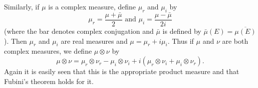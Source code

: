 Similarly, if $\mu$ is a complex measure, define $\mu_r$ and $\mu_i$ by $$\mu_r=\frac{\mu+\bar{\mu}}2\text{ and }\mu_i=\frac{\mu-\bar{\mu}}{2i}$$ (where the bar denotes complex conjugation and $\bar{\mu}$ is defined by $\bar{\mu}(E)=\overline{\mu(E)}$). Then $\mu_r$ and $\mu_i$ are real measures and $\mu=\mu_r+i\mu_i$. Thus if $\mu$ and $\nu$ are both complex measures, we define $\mu\otimes\nu$ by $$\mu\otimes\nu=\mu_r\otimes\nu_r-\mu_i\otimes\nu_i+i(\mu_r\otimes\nu_i+\mu_i\otimes\nu_r).$$ Again it is easily seen that this is the appropriate product measure and that Fubini's theorem holds for it.